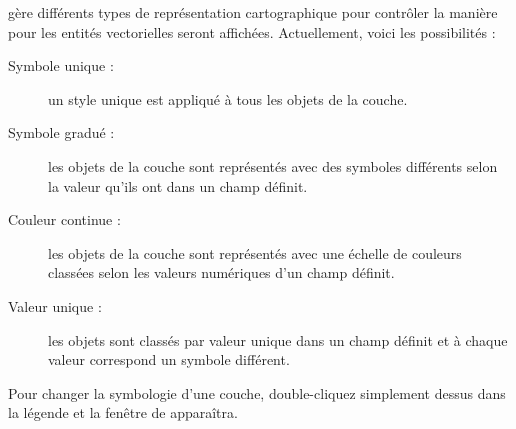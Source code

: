 \qg gère différents types de représentation cartographique pour contrôler la manière pour les entités vectorielles seront affichées. Actuellement, voici les possibilités :

\begin{description}
\item[Symbole unique :]  un style unique est appliqué à tous les objets de la couche.
\item[Symbole gradué :]  les objets de la couche sont représentés avec des symboles différents selon la valeur qu'ils ont dans un champ définit.
\item[Couleur continue :] les objets de la couche sont représentés avec une échelle de couleurs classées selon les valeurs numériques d'un champ définit.
\item[Valeur unique :]  les objets sont classés par valeur unique dans un champ définit et à chaque valeur correspond un symbole différent.
\end{description}

Pour changer la symbologie d'une couche, double-cliquez simplement dessus dans la légende et la fenêtre de  apparaîtra.


